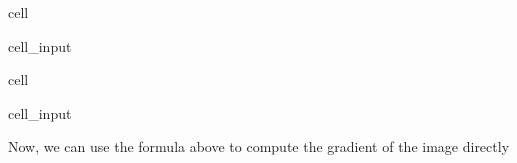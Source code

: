 \documentclass[letterpaper,10pt,english]{jupyterBook}
\begin{document}
\begin{sphinxuseclass}{cell}
\begin{sphinxVerbatimInput}
\begin{sphinxuseclass}{cell_input}
\end{sphinxuseclass}\end{sphinxVerbatimInput}

\end{sphinxuseclass}
\begin{sphinxuseclass}{cell}\begin{sphinxVerbatimInput}

\begin{sphinxuseclass}{cell_input}
\begin{sphinxVerbatim}[commandchars=\\\{\}]
    
\end{sphinxVerbatim}

\end{sphinxuseclass}\end{sphinxVerbatimInput}

\end{sphinxuseclass}
\sphinxAtStartPar
Now, we can use the formula above to compute the gradient of the image directly
\end{document}
